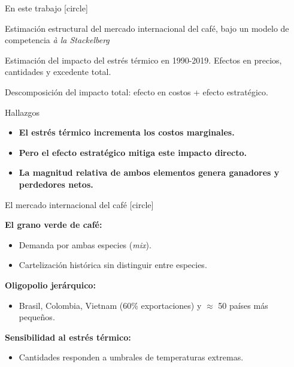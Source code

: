 \begin{frame}{En este trabajo}
    [circle]
    \begin{wideitemize}
        \item <1-> Estimación estructural del mercado internacional del café, bajo un modelo de competencia \textit{à la Stackelberg}

        \item <2-> Estimación del impacto del estrés térmico en 1990-2019. Efectos en precios, cantidades y excedente total.

        \item <3-> Descomposición del impacto total: efecto en costos + efecto estratégico.
        
        \item <4-> Hallazgos
        \begin{itemize}
        \item <4-> \textbf{\color{amaranth} El estrés térmico incrementa los costos marginales.}
        \item <4-> \textbf{\color{amaranth} Pero el efecto estratégico mitiga este impacto directo.}
        \item <4-> \textbf{\color{amaranth} La magnitud relativa de ambos elementos genera ganadores y perdedores netos.}
    \end{itemize}

        
        
    \end{wideitemize}
    \end{frame}

\begin{frame}{El mercado internacional del café}
    \label{frame:mercado_supuestos}
    [circle]
    \begin{wideitemize}
        \item \textbf{El grano verde de café:}
        \begin{itemize}
            \item Demanda por ambas especies (\textit{mix}).
            \item Cartelización histórica sin distinguir entre especies.
        \end{itemize}

        \item \textbf{Oligopolio jerárquico:}  \hyperlink{frame:oligopolio_plot}{}
        \begin{itemize}
            \item Brasil, Colombia, Vietnam (60\% exportaciones) y $\approx$ 50 países más pequeños.
        \end{itemize}

        \item \textbf{Sensibilidad al estrés térmico:} \hyperlink{frame:estres_plot}{}
        \begin{itemize}
            \item Cantidades responden a umbrales de temperaturas extremas.
        \end{itemize}
    \end{wideitemize}            
\end{frame}

